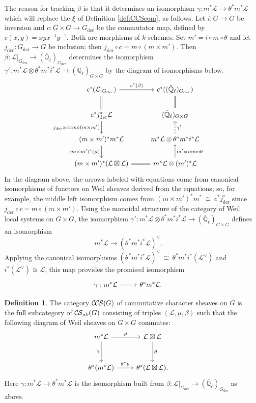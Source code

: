 \documentclass[10pt]{amsart}
\theoremstyle{plain}
\theoremstyle{definition}
\newtheorem{definition}[theorem]{Definition}
\newcommand{\EE}{\mathbb{\bar Q}_\ell}
\newcommand{\Fq}{k}
\newcommand{\der}{_{\operatorname{der}}}
\newcommand{\ab}{_{\operatorname{ab}}}
\newcommand{\iso}{{\ \cong\ }}
\newcommand{\cs}[1]{{\mathcal{#1}}}
\newcommand{\CS}{{\mathcal{C\hskip-0.8pt S}}}
\newcommand{\CCS}{{\mathcal{C\hskip-.8pt C\hskip-0.8pt S}}}
\begin{document}
The reason for tracking $\beta$ is that it determines an isomorphism $\gamma : m^*\cs{L} \to \theta^*m^*\cs{L}$ which will replace the $\xi$ of Definition \ref{def:CCScom}, as follows.
Let $i : G \to G$ be inversion and $c : G\times G\to G\der$ be the commutator map, defined by $c(x,y)= xyx^{-1}y^{-1}$.
Both are morphisms of $\Fq$-schemes.
Set $m' = i \circ m \circ \theta$ and let $j\der : G\der\to G$ be inclusion; then $j\der\circ c = m \circ (m \times m')$.
Then $\beta : \cs{L}\vert_{G\der} \to (\EE)_{G\der}$ determines the isomorphism $\gamma' : m^*\cs{L} \otimes \theta^* m^* i^*\cs{L} \to (\EE)_{G\times G}$ by the diagram of isomorphisms below.
\begin{equation}
\begin{tikzcd}
\arrow[equal]{d} c^* (\cs{L}\vert_{G\der}) \arrow{r}{c^*(\beta)} 
	&  c^*((\EE)_{G\der}) \arrow[equal]{d} \\
\arrow{d}[swap]{j\der\circ c = m \circ (m \times m')} c^* j\der^* \cs{L} 
	&   (\EE)_{G\times G} \\
(m \times m')^* m^* \cs{L} \arrow{d}[swap]{(m \times m')^*(\mu)} 
	&  m^*\cs{L} \otimes \theta^* m^* i^* \cs{L}  \arrow[dashed]{u}[swap]{\gamma'} \\
(m \times m')^* (\cs{L} \boxtimes \cs{L}) \arrow[equal]{r} 
	& m^*\cs{L} \otimes (m')^*\cs{L} \arrow{u}[swap]{m' = i\circ m\circ \theta} 
\end{tikzcd}
\end{equation}
In the diagram above, the arrows labeled with equations come from canonical isomorphisms of functors on Weil sheaves derived from the equations; so, for example, the middle left isomorphism comes from $(m\times m')^* m^* \iso c^* j\der^*$ since $j\der\circ c = m \circ (m \times m')$.
Using the monoidal structure of the category of Weil local systems on $G\times G$, the isomorphism $\gamma' : m^*\cs{L} \otimes \theta^* m^* i^*\cs{L} \to (\EE)_{G\times G}$ defines an isomorphism
\[
m^*\cs{L} \to (\theta^* m^* i^*\cs{L})^\vee.
\]
Applying the canonical isomorphisms $(\theta^* m^* i^*\cs{L})^\vee \iso \theta^* m^* i^* (\cs{L}^\vee)$ and $i^*(\cs{L}^\vee) \cong \cs{L}$, this map provides the promised isomorphism
\[
\begin{tikzcd}
\gamma : m^*\cs{L} \arrow{r} & \theta^* m^* \cs{L}.
\end{tikzcd}
\]

\begin{definition}\label{def:CCS}
The category $\CCS(G)$ of commutative character sheaves on $G$ is the full subcategory of $\CS\ab(G)$ consisting of triples $(\cs{L},\mu,\beta)$ such that the following diagram of Weil sheaves on $G \times G$ commutes:
  \[
  \begin{tikzcd}[row sep=30]
   m^*\cs{L} \arrow{d}[swap]{\gamma} \arrow{r}{\mu} & \cs{L}\boxtimes\cs{L} \arrow{d}{\vartheta}\\
   \theta^*(m^*\cs{L}) \arrow{r}{{\theta}^*\mu} &  \theta^*(\cs{L}\boxtimes\cs{L}).
  \end{tikzcd}
  \]
Here $\gamma : m^*\cs{L} \to \theta^* m^* \cs{L}$ is the isomorphism built from $\beta : \cs{L}\vert_{G\der} \to (\EE)_{G\der}$ as above. 
\end{definition}
\end{document}
